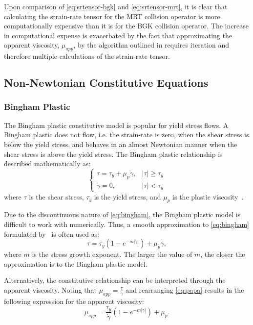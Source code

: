 \documentclass[pdftex,ms]{pittetd}
\begin{document}
Upon comparison of \eqref{eq:srtensor-bgk} and \eqref{eq:srtensor-mrt}, it is clear that calculating the strain-rate tensor for the MRT collision operator is more computationally expensive than it is for the BGK collision operator.
The increase in computational expense is exacerbated by the fact that approximating the apparent viscosity, $\mu_{app}$, by the algorithm outlined in  requires iteration and therefore multiple calculations of the strain-rate tensor.

\subsection{Non-Newtonian Constitutive Equations}

\subsubsection{Bingham Plastic} \label{sec:bp}

The Bingham plastic constitutive model is popular for yield stress flows.
A Bingham plastic does not flow, i.e. the strain-rate is zero, when the shear stress is below the yield stress, and behaves in an almost Newtonian manner when the shear stress is above the yield stress.
The Bingham plastic relationship is described mathematically as:
\begin{equation} \label{eq:bingham}
\begin{cases}
\tau = \tau_y + \mu_p \dot{\gamma}, & |\tau| \geq \tau_y \\
\dot{\gamma} = 0, & |\tau| < \tau_y
\end{cases}
\end{equation}
\noindent where $\tau$ is the shear stress, $\tau_y$ is the yield stress, and $\mu_p$ is the plastic viscosity~\cite{bingham1922fluidity}.

Due to the discontinuous nature of \eqref{eq:bingham}, the Bingham plastic model is difficult to work with numerically.
Thus, a smooth approximation to \eqref{eq:bingham} formulated by~\citet{papanastasiou1987flows} is often used as:
\begin{equation} \label{eq:papa}
\tau = \tau_y (1 - e^{-m |\dot{\gamma}|}) + \mu_p \dot{\gamma},
\end{equation}
\noindent where $m$ is the stress growth exponent.
The larger the value of $m$, the closer the approximation is to the Bingham plastic model.

Alternatively, the constitutive relationship can be interpreted through the apparent viscosity.
Noting that $\mu_{app} = \frac{\tau}{\dot{\gamma}}$ and rearranging \eqref{eq:papa} results in the following expression for the apparent viscosity:
\begin{equation} \label{eq:bing-mu-app}
\mu_{app} = \frac{\tau_y}{\dot{\gamma}} (1 - e^{-m |\dot{\gamma}|}) + \mu_p.
\end{equation}
\end{document}
